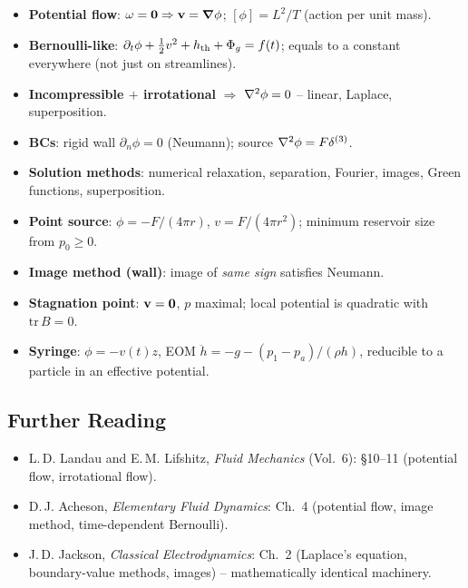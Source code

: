 \documentclass[../main.tex]{subfiles}
\begin{document}
\begin{itemize}
  \item \textbf{Potential flow}: $\mathbf{\omega}=\mathbf{0}\Rightarrow\mathbf{v}=\grad\phi$; $[\phi]=L^2/T$ (action per unit mass).
  \item \textbf{Bernoulli-like}: $\partial_t\phi + \tfrac{1}{2}v^2 + h_{\rm th} + \Phi_g = f(t)$; equals to a constant everywhere (not just on streamlines).
  \item \textbf{Incompressible $+$ irrotational} $\Rightarrow$ $\nabla^2\phi=0$ -- linear, Laplace, superposition.
  \item \textbf{BCs}: rigid wall $\partial_n\phi=0$ (Neumann); source $\nabla^2\phi=F\delta^{(3)}$.
  \item \textbf{Solution methods}: numerical relaxation, separation, Fourier, images, Green functions, superposition.
  \item \textbf{Point source}: $\phi=-F/(4\pi r)$, $v=F/(4\pi r^2)$; minimum reservoir size from $p_0\ge 0$.
  \item \textbf{Image method (wall)}: image of \emph{same sign} satisfies Neumann.
  \item \textbf{Stagnation point}: $\mathbf{v}=\mathbf{0}$, $p$ maximal; local potential is quadratic with $\mathrm{tr}\,B=0$.
  \item \textbf{Syringe}: $\phi=-v(t)z$, EOM $\ddot h = -g -(p_1-p_a)/(\rho h)$, reducible to a particle in an effective potential.
\end{itemize}

\subsection*{Further Reading}
\begin{itemize}
  \item L.\,D. Landau and E.\,M. Lifshitz, \textit{Fluid Mechanics} (Vol.\ 6): \S10--11 (potential flow, irrotational flow).
  \item D.\,J. Acheson, \textit{Elementary Fluid Dynamics}: Ch.\ 4 (potential flow, image method, time-dependent Bernoulli).
  \item J.\,D. Jackson, \textit{Classical Electrodynamics}: Ch.\ 2 (Laplace's equation, boundary-value methods, images) -- mathematically identical machinery.
\end{itemize}
\end{document}
